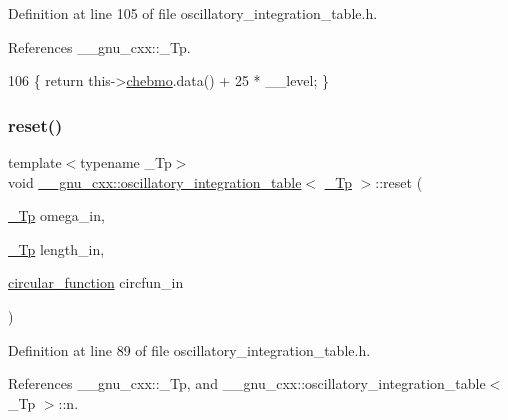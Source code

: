 Definition at line 105 of file oscillatory\+\_\+integration\+\_\+table.\+h.



References \+\_\+\+\_\+gnu\+\_\+cxx\+::\+\_\+\+Tp.


\begin{DoxyCode}
106       \{ \textcolor{keywordflow}{return} this->\hyperlink{struct____gnu__cxx_1_1oscillatory__integration__table_a29c973330c5f164962da57a528ccab55}{chebmo}.data() + 25 * \_\_level; \}
\end{DoxyCode}
\mbox{\label{struct____gnu__cxx_1_1oscillatory__integration__table_a6eac687c4e5dc65c8bf6626b24839975}} 
\subsubsection{\texorpdfstring{reset()}{reset()}}
{\footnotesize\ttfamily template$<$typename \+\_\+\+Tp$>$ \\
void \hyperlink{struct____gnu__cxx_1_1oscillatory__integration__table}{\+\_\+\+\_\+gnu\+\_\+cxx\+::oscillatory\+\_\+integration\+\_\+table}$<$ \hyperlink{namespace____gnu__cxx_a3b19a9c800ca194374ef9172290f7d79}{\+\_\+\+Tp} $>$\+::reset (\begin{DoxyParamCaption}\item[{\hyperlink{namespace____gnu__cxx_a3b19a9c800ca194374ef9172290f7d79}{\+\_\+\+Tp}}]{omega\+\_\+in,  }\item[{\hyperlink{namespace____gnu__cxx_a3b19a9c800ca194374ef9172290f7d79}{\+\_\+\+Tp}}]{length\+\_\+in,  }\item[{\hyperlink{struct____gnu__cxx_1_1oscillatory__integration__table_aea06e472bb9ff6c535cfdc6a84b14e96}{circular\+\_\+function}}]{circfun\+\_\+in }\end{DoxyParamCaption})\hspace{0.3cm}{\ttfamily [inline]}}



Definition at line 89 of file oscillatory\+\_\+integration\+\_\+table.\+h.



References \+\_\+\+\_\+gnu\+\_\+cxx\+::\+\_\+\+Tp, and \+\_\+\+\_\+gnu\+\_\+cxx\+::oscillatory\+\_\+integration\+\_\+table$<$ \+\_\+\+Tp $>$\+::n.




